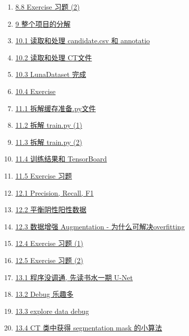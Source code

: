\documentclass[11pt]{article}
\begin{document}
\begin{enumerate}
	\item \href{https://mp.weixin.qq.com/s/HGkmnYuPl36cZTGFYCu8fQ}{8.8 Exercise 习题 (2)}	%
	\item \href{https://mp.weixin.qq.com/s/Ymay8JW_txqqLZHmR2w5Rw}{9 整个项目的分解}	%
	\item \href{https://mp.weixin.qq.com/s/2ITdHjl3pE1MbkwrP_0h9A}{10.1 读取和处理 candidate.csv 和 annotatio}	%
	\item \href{https://mp.weixin.qq.com/s/Th8JZrmaD2LEUKx08YQlvw}{10.2 读取和处理 CT文件}	%
	\item \href{https://mp.weixin.qq.com/s/lIzTsdNRAcOUwMsjzdne_Q}{10.3 LunaDataset 完成}	%
	\item \href{https://mp.weixin.qq.com/s/0PRdfoS_JFB1Q1FrKekrrg}{10.4 Exercise}	%
	\item \href{https://mp.weixin.qq.com/s/nHCuviWnYNLiOa0FfnJOEA}{11.1 拆解缓存准备.py文件}	%
	\item \href{https://mp.weixin.qq.com/s/FOwuu0XcUOSJ2apWjFVwsg}{11.2 拆解 train.py (1)}	%
	\item \href{https://mp.weixin.qq.com/s/x7z3bPo4ozUAlyPyYAJbGQ}{11.3 拆解 train.py (2)}	%
	\item \href{https://mp.weixin.qq.com/s/H4cwFWNLjZb3WZHuTQzuyg}{11.4 训练结果和 TensorBoard}	%
	\item \href{https://mp.weixin.qq.com/s/xyQoo7qDBxN_Zk8Wt1FElQ}{11.5 Exercise 习题}	%
	\item \href{https://mp.weixin.qq.com/s/OqJ-vUynfT5xhSqPDtE2Dw}{12.1 Precision, Recall, F1}	%
	\item \href{https://mp.weixin.qq.com/s/gUEClB605k4iz6YbxgEXhQ}{12.2 平衡阴性阳性数据}	%
	\item \href{https://mp.weixin.qq.com/s/qqZOqRp-Urn11w8IvmXufw}{12.3 数据增强 Augmentation - 为什么可解决overfitting}	%
	\item \href{https://mp.weixin.qq.com/s/KTbE3D77ytEA199gVcLuXg}{12.4 Exercise 习题 (1)}	%
	\item \href{https://mp.weixin.qq.com/s/xs18IxlwNQI1EBXU6E6BmQ}{12.5 Exercise 习题 (2)}	%
	\item \href{https://mp.weixin.qq.com/s/J1qWWp5EMnlKmGKHd7FOpQ}{13.1 程序没调通, 先读书水一期 U-Net}	%
	\item \href{https://mp.weixin.qq.com/s/1Ik9lzNetz8-9rkNC214ew}{13.2 Debug 乐趣多}	%
	\item \href{https://mp.weixin.qq.com/s/br9IxnOfIxSkEHM0FPycsQ}{13.3 explore data debug}	%
	\item \href{https://mp.weixin.qq.com/s/Ua2lGl55RXBm70UQwTv5eQ}{13.4 CT 类中获得 segmentation mask 的小算法}	%

\end{enumerate}
\end{document}

